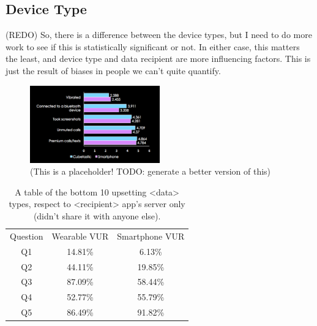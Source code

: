 \documentclass{acm_proc_article-sp}
\begin{document}
\subsection{Device Type}

(REDO) So, there is a difference between the device types, but I need to do more work to see if this is statistically significant or not. In either case, this matters the least, and device type and data recipient are more influencing factors. This is just the result of biases in people we can't quite quantify.  

\begin{figure}
	\centering
	\includegraphics[width=0.5\textwidth]{device-type.png}
	\caption{(This is a placeholder! TODO: generate a better version of this)}
\end{figure}

\begin{table}%
\begin{center}
\begin{tabular}{| c | c | c |}
 Question &  Wearable VUR & Smartphone VUR \\
Q1 & 14.81\%  &  6.13\%\\
Q2 & 44.11\%  &  19.85\%\\
Q3 & 87.09\%  &  58.44\%\\
Q4 & 52.77\%  & 55.79\%\\
Q5 & 86.49\%  &  91.82\%\\ 
\end{tabular}
\caption{A table of the bottom 10 upsetting <data> types, respect to <recipient> app's server only (didn't share it with anyone else).}
\label{deviceVUR}
\end{center}
\end{table}
\end{document}
